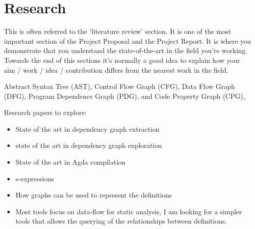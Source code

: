 
\chapter{Research}

This is often referred to the ‘literature review’ section. It is one of the most important
section of the Project Proposal and the Project Report. It is where you demonstrate that you
understand the state-of-the-art in the field you’re working. Towards the end of this sections it’s
normally a good idea to explain how your aim / work / idea / contribution differs from the nearest
work in the field.

Abstract Syntax Tree (AST), Control Flow Graph (CFG), Data Flow Graph (DFG), Program Dependence Graph (PDG), and Code Property Graph (CPG),

Research papers to explore:
\begin{itemize}
    \item State of the art in dependency graph extraction 
    \item state of the art in dependency graph exploration
    \item State of the art in Agda compilation 
\end{itemize}

\begin{itemize}
\item s-expressions 
\item How graphs can be used to represent the definitions
\item Most tools focus on data-flow for static analysis, I am looking
    for a simpler tools that allows the querying of the relationships between
    definitions.
\end{itemize}

